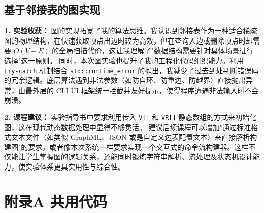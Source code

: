 \documentclass[supercite]{Experimental_Report}
\theoremstyle{definition}
\begin{document}
\subsection{基于邻接表的图实现}

\textbf{1. 实验收获：}
图的实现拓宽了我的算法思维。我认识到邻接表作为一种适合稀疏图的物理结构，在快速获取顶点出边时较为高效，但在查询入边或删除顶点时却需要 $O(V+E)$ 的全局扫描代价，这让我理解了"数据结构需要针对具体场景进行选择"这一原则。
同时，本次图实验也提升了我的工程化代码组织能力。利用 \texttt{try-catch} 机制结合 \texttt{std::runtime\_error} 的抛出，我减少了过去到处判断错误码的冗余逻辑。底层算法遇到非法参数（如防自环、防重边、防越界）直接抛出异常，由最外层的 CLI UI 框架统一拦截并友好提示，使得程序遭遇非法输入时不会崩溃。

\textbf{2. 课程建议：}
实验指导书中要求利用传入 \texttt{V[]} 和 \texttt{VR[]} 静态数组的方式来初始化图，这在现代动态数据处理中显得不够灵活。
建议后续课程可以增加"通过标准格式文本文件（如类似 GraphML、JSON 或是自定义边表配置文本）来直接解析构建图"的要求，或者像本次系统一样要求实现一个交互式的命令流构建器。这样不仅能让学生掌握图的逻辑关系，还能同时锻炼字符串解析、流处理及状态机设计能力，使实验体系更具实用性与综合性。

\nocite{*} %



\setcounter{secnumdepth}{0}

\appendix
\section{附录A 共用代码}
\end{document}
